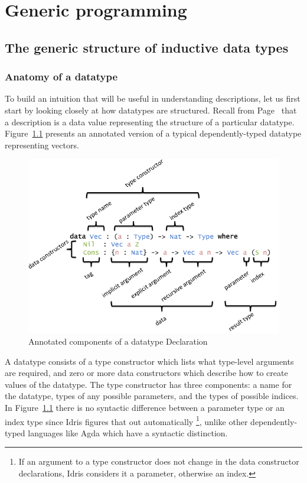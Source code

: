 \documentclass{ituthesis}
\theoremstyle{break}
\begin{document}
\chapter{Generic programming}
\label{cha:GenericProgramming}
\section{The generic structure of inductive data types}
\label{sec:TheGenericStructureofInductiveDataTypes}
\subsection{Anatomy of a datatype}
\label{sub:AnatomyofaDatatype}
To build an intuition that will be useful in understanding descriptions, let us first start by looking closely at how datatypes are structured.
Recall from Page~\pageref{kw:desc} that a description is a data value representing the structure of a particular datatype.
Figure~\ref{fig:anatomydatatype} presents an annotated version of a typical dependently-typed datatype representing vectors.

\begin{figure}[ht]
\begin{center}
    \includegraphics[scale=0.5]{Figures/AnatomyOfADatatype.png}
\end{center}
\caption{Annotated components of a datatype Declaration}
\label{fig:anatomydatatype}
\end{figure}

A datatype consists of a type constructor which lists what type-level arguments are required, and zero or more data constructors which describe how to create values of the datatype.
The type constructor has three components: a name for the datatype, types of any possible parameters, and the types of possible indices.
In Figure~\ref{fig:anatomydatatype} there is no syntactic difference between a parameter type or an index type since Idris figures that out automatically
\footnote{If an argument to a type constructor does not change in the data constructor declarations, Idris considers it a parameter, otherwise an index.},
unlike other dependently-typed languages like Agda which have a syntactic distinction.
\end{document}
